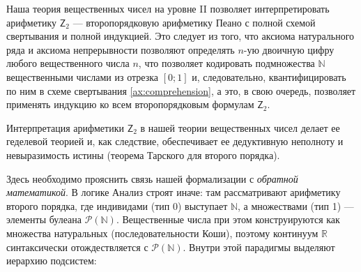 \documentclass[11pt, a4paper]{extarticle}
\newcommand{\Pcal}{{\mathcal P}}
\newcommand{\R}{{\mathbb R}}
\newcommand{\N}{{\mathbb N}}
\begin{document}
\begin{remark}
Наша теория вещественных чисел на уровне II позволяет интерпретировать арифметику $\mathsf{Z}_2$ --- второпорядковую арифметику Пеано с полной схемой свертывания и полной индукцией. Это следует из того, что аксиома натурального ряда и аксиома непрерывности позволяют определять $n$-ую двоичную цифру любого вещественного числа $n$, что позволяет кодировать подмножества $\N$ вещественными числами из отрезка $[0;1]$ и, следовательно, квантифицировать по ним в схеме свертывания \ref{ax:comprehension}, а это, в свою очередь, позволяет применять индукцию ко всем второпорядковым формулам $\mathsf{Z}_2$.

Интерпретация арифметики $\mathsf{Z}_2$ в нашей теории вещественных чисел делает ее геделевой теорией и, как следствие, обеспечивает ее дедуктивную неполноту и невыразимость истины (теорема Тарского для второго порядка).

Здесь необходимо прояснить связь нашей формализации с \emph{обратной математикой}. В логике Анализ строят иначе: там рассматривают арифметику второго порядка, где индивидами (тип 0) выступает $\N$, а множествами (тип 1) --- элементы булеана $\Pcal(\N)$. Вещественные числа при этом конструируются как множества натуральных (последовательности Коши), поэтому континуум $\R$ синтаксически отождествляется с $\Pcal(\N)$. Внутри этой парадигмы выделяют иерархию подсистем:


\end{remark}
\end{document}
